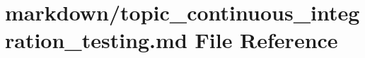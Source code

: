 \hypertarget{topic__continuous__integration__testing_8md}{}\section{markdown/topic\+\_\+continuous\+\_\+integration\+\_\+testing.md File Reference}
\label{topic__continuous__integration__testing_8md}
